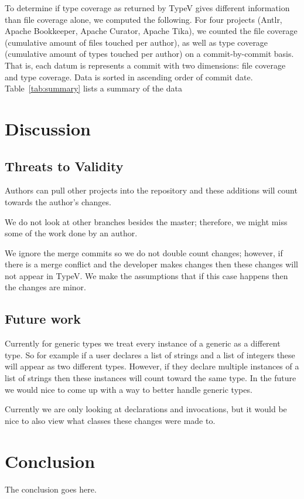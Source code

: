 \documentclass[conference]{IEEEtran}
\begin{document}
To determine if type coverage as returned by TypeV gives different information than file coverage alone, we computed the following. For four projects (Antlr, Apache Bookkeeper, Apache Curator, Apache Tika), we counted the file coverage (cumulative amount of files touched per author), as well as type coverage (cumulative amount of types touched per author) on a commit-by-commit basis. That is, each datum is represents a commit with two dimensions: file coverage and type coverage. Data is sorted in ascending order of commit date. Table~\ref{tab:summary} lists a summary of the data 

\section{Discussion}

\subsection{Threats to Validity}

Authors can pull other projects into the repository and these additions will count towards the author's changes. 

We do not look at other branches besides the master; therefore, we might miss some of the work done by an author.

We ignore the merge commits so we do not double count changes; however, if there is a merge conflict and the developer makes changes then these changes will not appear in TypeV. We make the assumptions that if this case happens then the changes are minor.

\subsection{Future work}

Currently for generic types we treat every instance of a generic as a different type. So for example if a user declares a list of strings and a list of integers these will appear as two different types. However, if they declare multiple instances of a list of strings then these instances will count toward the same type. In the future we would nice to come up with a way to better handle generic types.

Currently we are only looking at declarations and invocations, but it would be nice to also view what classes these changes were made to.

\section{Conclusion}
The conclusion goes here.
\end{document}
